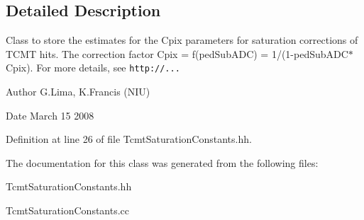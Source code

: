 \subsection{Detailed Description}
Class to store the estimates for the Cpix parameters for saturation corrections of TCMT hits. The correction factor Cpix = f(pedSubADC) = 1/(1-\/pedSubADC$\ast$Cpix). For more details, see {\tt http://...} \begin{DoxyAuthor}{Author}
G.Lima, K.Francis (NIU) 
\end{DoxyAuthor}
\begin{DoxyDate}{Date}
March 15 2008 
\end{DoxyDate}


Definition at line 26 of file TcmtSaturationConstants.hh.

The documentation for this class was generated from the following files:\begin{DoxyCompactItemize}
\item 
TcmtSaturationConstants.hh\item 
TcmtSaturationConstants.cc\end{DoxyCompactItemize}

